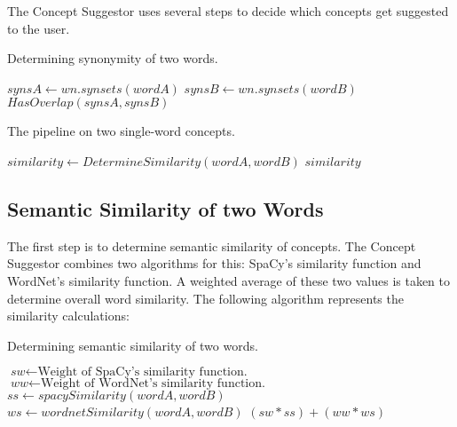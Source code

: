 \documentclass{article}
\begin{document}
The Concept Suggestor uses several steps to decide which concepts get suggested to the user. 

\begin{algorithm}
\caption{Determining synonymity of two words.}\label{al:synonymity}
\begin{algorithmic}[1]
		\State $\textit{synsA} \gets \textit{wn.synsets}(wordA)$
		\State $\textit{synsB} \gets \textit{wn.synsets}(wordB)$
		\State \Return $\textit{HasOverlap}(synsA, synsB)$
	\EndProcedure
\end{algorithmic}
\end{algorithm}

\begin{algorithm}
\caption{The pipeline on two single-word concepts.}\label{al:twowordpipeline}
\begin{algorithmic}[1]
		\State $\textit{similarity} \gets \textit{DetermineSimilarity}(wordA, wordB)$
				\State {}
			\EndIf
		\EndIf
		\State \Return $\textit{similarity}$
	\EndProcedure
\end{algorithmic}
\end{algorithm}


\subsection{Semantic Similarity of two Words}

The first step is to determine semantic similarity of concepts. The Concept Suggestor combines two algorithms for this: SpaCy's similarity function and WordNet's similarity function. A weighted average of these two values is taken to determine overall word similarity. The following algorithm represents the similarity calculations: %
\begin{algorithm}
\caption{Determining semantic similarity of two words.}\label{al:semanticsimilarity}
\begin{algorithmic}[1]
		\State $\textit{sw} \gets \text{Weight of SpaCy's similarity function.}$
		\State $\textit{ww} \gets \text{Weight of WordNet's similarity function.}$
		\State $\textit{ss} \gets \textit{spacySimilarity}(wordA, wordB)$
		\State $\textit{ws} \gets \textit{wordnetSimilarity}(wordA, wordB)$
		\State \Return $(sw*ss)+(ww*ws)$
	\EndProcedure
\end{algorithmic}
\end{algorithm}
\end{document}
